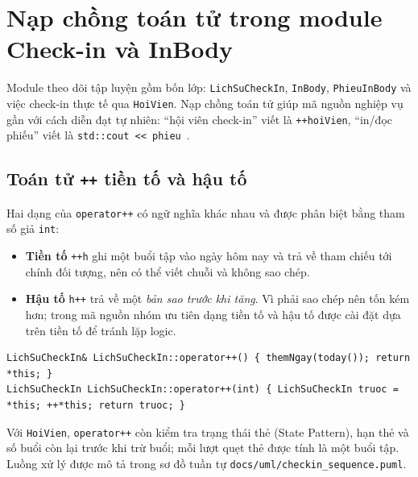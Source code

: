 \section{Nạp chồng toán tử trong module Check-in và InBody}
Module theo dõi tập luyện gồm bốn lớp: \texttt{LichSuCheckIn}, \texttt{InBody}, \texttt{PhieuInBody} và việc check-in thực tế qua \texttt{HoiVien}. Nạp chồng toán tử giúp mã nguồn nghiệp vụ gần với cách diễn đạt tự nhiên: ``hội viên check-in'' viết là \texttt{++hoiVien}, ``in/đọc phiếu'' viết là \texttt{std::cout << phieu}~\cite{stroustrup2013}.

\subsection{Toán tử \texttt{++} tiền tố và hậu tố}
Hai dạng của \texttt{operator++} có ngữ nghĩa khác nhau và được phân biệt bằng tham số giả \texttt{int}:
\begin{itemize}[leftmargin=*]
  \item \textbf{Tiền tố} \texttt{++h} ghi một buổi tập vào ngày hôm nay và trả về tham chiếu tới chính đối tượng, nên có thể viết chuỗi và không sao chép.
  \item \textbf{Hậu tố} \texttt{h++} trả về một \emph{bản sao trước khi tăng}. Vì phải sao chép nên tốn kém hơn; trong mã nguồn nhóm ưu tiên dạng tiền tố và hậu tố được cài đặt dựa trên tiền tố để tránh lặp logic.
\end{itemize}
\begin{lstlisting}
LichSuCheckIn& LichSuCheckIn::operator++() { themNgay(today()); return *this; }
LichSuCheckIn LichSuCheckIn::operator++(int) { LichSuCheckIn truoc = *this; ++*this; return truoc; }
\end{lstlisting}
Với \texttt{HoiVien}, \texttt{operator++} còn kiểm tra trạng thái thẻ (State Pattern), hạn thẻ và số buổi còn lại trước khi trừ buổi; mỗi lượt quẹt thẻ được tính là một buổi tập. Luồng xử lý được mô tả trong sơ đồ tuần tự \texttt{docs/uml/checkin\_sequence.puml}.

